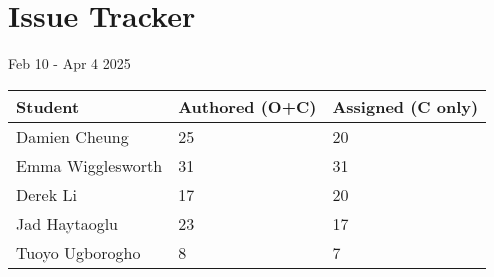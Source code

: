 \documentclass{article}
\begin{document}
\section{Issue Tracker}

Feb 10 - Apr 4 2025

\begin{table}[H]
\centering
\begin{tabular}{lll}
\toprule
\textbf{Student} & \textbf{Authored (O+C)} & \textbf{Assigned (C only)}\\
\midrule
Damien Cheung & 25 & 20 \\
Emma Wigglesworth & 31 & 31 \\
Derek Li & 17 & 20 \\
Jad Haytaoglu & 23 & 17 \\
Tuoyo Ugborogho & 8 & 7 \\
\bottomrule
\end{tabular}
\end{table}
\end{document}
